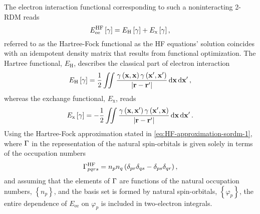 \begin{enumerate}
        The electron interaction functional corresponding to such a
        noninteracting 2-RDM reads 
        \begin{equation}
            E_{\text{ee}}^{\text{HF}} \left[ \gamma \right] =
            E_{\text{H}} \left[ \gamma \right] + E_{\text{x}} \left[ \gamma \right]
            ,
        \end{equation}
        referred to as the Hartree-Fock functional as the HF equations' 
        solution coincides with an idempotent density matrix that results 
        from functional optimization.
        The Hartree functional, $E_{\text{H}}$, describes the classical
        part of electron interaction 
        \begin{equation}
            E_{\text{H}} \left[ \gamma \right] = \frac{1}{2} \iint
            \frac{
                \gamma \left( \boldsymbol{\mathrm{x}}, \boldsymbol{\mathrm{x}} \right)
                \gamma \left( \boldsymbol{\mathrm{x}}^{\prime}, \boldsymbol{\mathrm{x}}^{\prime} \right)
            }{\left| \boldsymbol{\mathrm{r}} - \boldsymbol{\mathrm{r}}^{\prime} \right|}
            \dd{ \boldsymbol{\mathrm{x}}} \dd{ \boldsymbol{\mathrm{x}}^{\prime}}
            ,
        \end{equation}
        whereas the exchange functional, $E_{\text{x}}$, reads 
        \begin{equation}
            E_{\text{x}} \left[ \gamma \right] = -\frac{1}{2} \iint
            \frac{
                \gamma \left( \boldsymbol{\mathrm{x}}, \boldsymbol{\mathrm{x}}^{\prime} \right)
                \gamma \left( \boldsymbol{\mathrm{x}}^{\prime}, \boldsymbol{\mathrm{x}} \right)
            }{\left| \boldsymbol{\mathrm{r}} - \boldsymbol{\mathrm{r}}^{\prime} \right|}
            \dd{ \boldsymbol{\mathrm{x}}} \dd{ \boldsymbol{\mathrm{x}}^{\prime}}
            .
        \end{equation}
        Using the Hartree-Fock approximation stated in \cref{eq:HF-approximation-sordm-1},
        where $\Gamma$ in the representation of the natural spin-orbitals is given 
        solely in terms of the occupation numbers
        \begin{equation}
            \Gamma_{pqrs}^{\text{HF}}
            =
            n_p n_q \left( \delta_{pr} \delta_{qs} - \delta_{ps} \delta_{qr} \right)
            ,
        \end{equation}
        and assuming that the elements of $\Gamma$ are functions of the natural 
        occupation numbers, $\left\{ n_p \right\}$, and the basis set is formed by 
        natural spin-orbitals, $\left\{ \varphi_p \right\}$, the entire dependence of
        $E_{\text{ee}}$ on $\varphi_p$ is included in two-electron integrals.


\end{enumerate}
